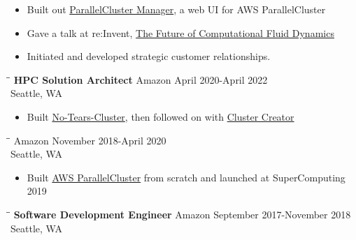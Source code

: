 \documentclass{res}
\begin{document}
\begin{resume}
\begin{itemize}
   \setlength\itemsep{0em}
\item Built out \href{https://pcluster.cloud/}{ParallelCluster Manager}, a web UI for AWS ParallelCluster
\item Gave a talk at re:Invent, \href{https://swsmith.cc/slides/CMP208-CFD-in-Cloud.pdf}{The Future of Computational Fluid Dynamics}
\item Initiated and developed strategic customer relationships.
    \end{itemize}
\vspace{-0.10in}
 \begin{tabbing}
   \hspace{2.5in}\= \hspace{2.6in}\= \kill %
    {\bf HPC Solution Architect} \>Amazon     \>April 2020-April 2022\\
                             \>Seattle, WA
   \end{tabbing}\vspace{-10pt}      %
   \begin{itemize}
   \setlength\itemsep{0em}
\item Built \href{https://github.com/aws-samples/no-tears-cluster}{No-Tears-Cluster}, then followed on with \href{https://cluster-creator.swsmith.cc/}{Cluster Creator}
    \end{itemize}
\vspace{-0.10in}
 \begin{tabbing}
   \hspace{2.5in}\= \hspace{2.6in}\= \kill %
    {\bf  } \>Amazon     \>November 2018-April 2020\\
                             \>Seattle, WA
   \end{tabbing}\vspace{-10pt}      %
   \begin{itemize}
   \setlength\itemsep{0em}
\item Built \href{https://github.com/aws/aws-parallelcluster}{AWS ParallelCluster} from scratch and launched at SuperComputing 2019
    \end{itemize}
\vspace{-0.10in}
 \begin{tabbing}
   \hspace{2.5in}\= \hspace{2.6in}\= \kill %
    {\bf Software Development Engineer} \>Amazon     \>September 2017-November 2018\\
                             \>Seattle, WA
   \end{tabbing}\vspace{-10pt}      %
\vspace{-0.10in}

\end{resume}
\end{document}
